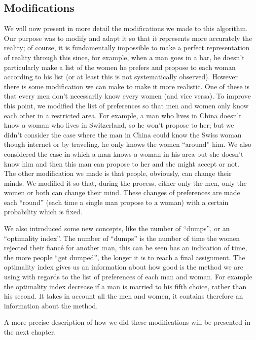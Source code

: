 \documentclass[11pt]{article}
\begin{document}
\subsection{Modifications} \label{mods}

We will now present in more detail the modifications we made to this algorithm. Our purpose was 
to modify and adapt it so that it represents more accurately the reality; of course, it is fundamentally 
impossible to make a perfect representation of reality through this since, for example, when a man 
goes in a bar, he doesn’t particularly make a list of the women he prefers and propose to each 
woman according to his list (or at least this is not systematically observed). 
However there is some modification we can make to make it more realistic. One of these is that 
every men don’t necessarily know every women (and vice versa). To improve this point, we modified 
the list of preferences so that men and women only know each other in a restricted area. For 
example, a man who lives in China doesn’t know a woman who lives in Switzerland, so he won’t 
propose to her; but we didn’t consider the case where the man in China could know the Swiss 
woman though internet or by traveling, he only knows the women “around” him. We also considered 
the case in which a man knows a woman in his area but she doesn’t know him and then this man can 
propose to her and she might accept or not. 
The other modification we made is that people, obviously, can change their minds. We modified it so 
that, during the process, either only the men, only the women or both can change their mind. These 
changes of preferences are made each “round” (each time a single man propose to a woman) with a 
certain probability which is fixed.

We also introduced some new concepts, like the number of “dumps”, or an “optimality index”. The 
number of “dumps” is the number of time the women rejected their fiancé for another man, this can 
be seen has an indication of time, the more people “get dumped”, the longer it is to reach a final 
assignment. 
The optimality index gives us an information about how good is the method we are using with 
regards to the list of preferences of each man and woman. For example the optimality index 
decrease if a man is married to his fifth choice, rather than his second. It takes in account all the men 
and women, it contains therefore an information about the method.

A more precise description of how we did these modifications will be presented in the next chapter.
\end{document}
